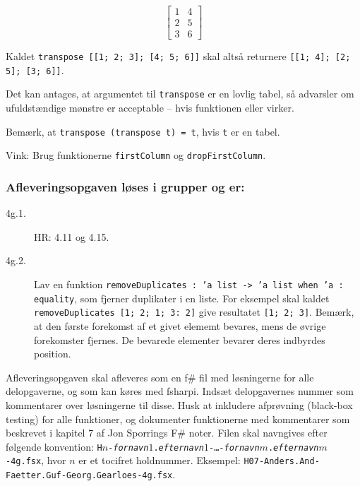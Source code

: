 \documentclass[a4paper]{article}
\begin{document}
\begin{description}
\begin{enumerate}[i]
\[\left [\begin{array}{rr}
1 & 4 \\
2 & 5 \\
3 & 6
\end{array}
\right ]\]

\noindent
Kaldet \texttt{transpose [[1; 2; 3]; [4; 5; 6]]} skal altså returnere \texttt{[[1; 4]; [2; 5]; [3; 6]]}.

Det kan antages, at argumentet til \texttt{transpose} er en lovlig
tabel, så advarsler om ufuldstændige mønstre er acceptable -- hvis
funktionen eller virker.

Bemærk, at \texttt{transpose (transpose t) = t}, hvis \texttt{t} er en
tabel.

Vink: Brug funktionerne \texttt{firstColumn} og \texttt{dropFirstColumn}.

\end{enumerate}

\end{description}

\subsubsection*{Afleveringsopgaven løses i grupper og er:}


\begin{description}
\item[4g.1.] HR: 4.11 og 4.15.

\item[4g.2.] Lav en funktion \texttt{removeDuplicates : 'a list -> 'a list
  when 'a : equality}, som fjerner duplikater i en liste.  For
  eksempel skal kaldet \texttt{removeDuplicates [1; 2; 1; 3: 2]}
  give resultatet \texttt{[1; 2; 3]}.  Bemærk, at den første
  forekomst af et givet elememt bevares, mens de øvrige forekomster
  fjernes.  De bevarede elementer bevarer deres indbyrdes position.

\end{description}

\noindent
Afleveringsopgaven skal afleveres som en f\#{} fil med løsningerne for
alle delopgaverne, og som kan køres med fsharpi.  Indsæt delopgavernes
nummer som kommentarer over løsningerne til disse.  Husk at inkludere
afprøvning (black-box testing) for alle funktioner, og dokumenter
funktionerne med kommentarer som beskrevet i kapitel 7 af Jon
Sporrings F\#{} noter.  Filen skal navngives efter følgende
konvention: \texttt{H$n$-\emph{fornavn$1$}.\emph{efternavn$1$}-\ldots-\emph{fornavn$m$}.\emph{efternavn$m$}-4g.fsx}, hvor
$n$ er et tocifret holdnummer.  Eksempel:
\texttt{H07-Anders.And-Faetter.Guf-Georg.Gearloes-4g.fsx}.
\end{document}

